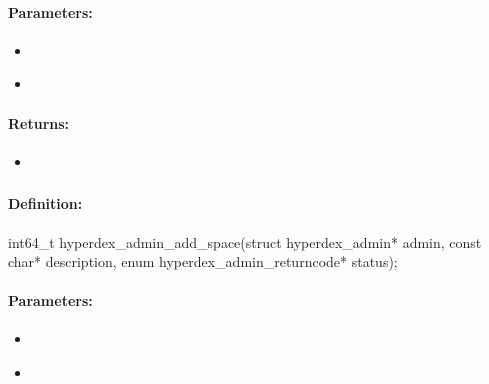 \paragraph{Parameters:}
\begin{itemize}[noitemsep]
\item {}\\

\item {}\\

\end{itemize}

\paragraph{Returns:}
\begin{itemize}[noitemsep]
\item {}\\

\end{itemize}

\pagebreak
\subsubsection{}
\label{api:c:add_space}


\paragraph{Definition:}
\begin{ccode}
int64_t hyperdex_admin_add_space(struct hyperdex_admin* admin,
        const char* description,
        enum hyperdex_admin_returncode* status);
\end{ccode}

\paragraph{Parameters:}
\begin{itemize}[noitemsep]
\item {}\\

\item {}\\

\end{itemize}

